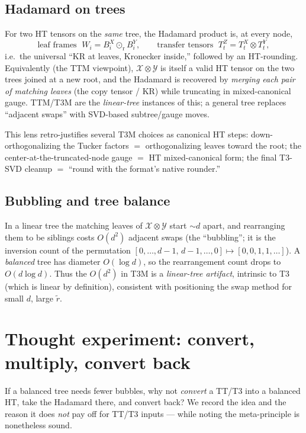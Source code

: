 \documentclass[11pt]{article}
\newcommand{\X}{\mathcal{X}}
\newcommand{\Y}{\mathcal{Y}}
\newcommand{\krrow}{\odot_{\mathrm{r}}}     %
\newcommand{\kron}{\otimes}
\newcommand{\rtil}{\tilde{r}}
\begin{document}
\subsection{Hadamard on trees}
For two HT tensors on the \emph{same} tree, the Hadamard product is, at every node,
\[
\text{leaf frames } \;W_i = B^X_i\krrow B^Y_i,
\qquad
\text{transfer tensors } \; T^Z_t = T^X_t\kron T^Y_t,
\]
i.e.\ the universal ``KR at leaves, Kronecker inside,'' followed by an HT-rounding.
Equivalently (the TTM viewpoint), $\X\kron\Y$ is itself a valid HT tensor on the
two trees joined at a new root, and the Hadamard is recovered by \emph{merging each
pair of matching leaves} (the copy tensor / KR) while truncating in mixed-canonical
gauge. TTM/T3M are the \emph{linear-tree} instances of this; a general tree replaces
``adjacent swaps'' with SVD-based subtree/gauge moves.

This lens retro-justifies several T3M choices as canonical HT steps:
down-orthogonalizing the Tucker factors $=$ orthogonalizing leaves toward the root;
the center-at-the-truncated-node gauge $=$ HT mixed-canonical form; the final
T3-SVD cleanup $=$ ``round with the format's native rounder.''

\subsection{Bubbling and tree balance}
In a linear tree the matching leaves of $\X\kron\Y$ start $\sim d$ apart, and
rearranging them to be siblings costs $O(d^2)$ adjacent swaps (the ``bubbling'';
it is the inversion count of the permutation
$[0,\dots,d{-}1,\,d{-}1,\dots,0]\mapsto[0,0,1,1,\dots]$). A \emph{balanced} tree has
diameter $O(\log d)$, so the rearrangement count drops to $O(d\log d)$. Thus the
$O(d^2)$ in T3M is a \emph{linear-tree artifact}, intrinsic to T3 (which is linear
by definition), consistent with positioning the swap method for small $d$, large
$\rtil$.

\section{Thought experiment: convert, multiply, convert back}
\label{sec:convert}

If a balanced tree needs fewer bubbles, why not \emph{convert} a TT/T3 into a
balanced HT, take the Hadamard there, and convert back? We record the idea and the
reason it does \emph{not} pay off for TT/T3 inputs --- while noting the
meta-principle is nonetheless sound.
\end{document}
